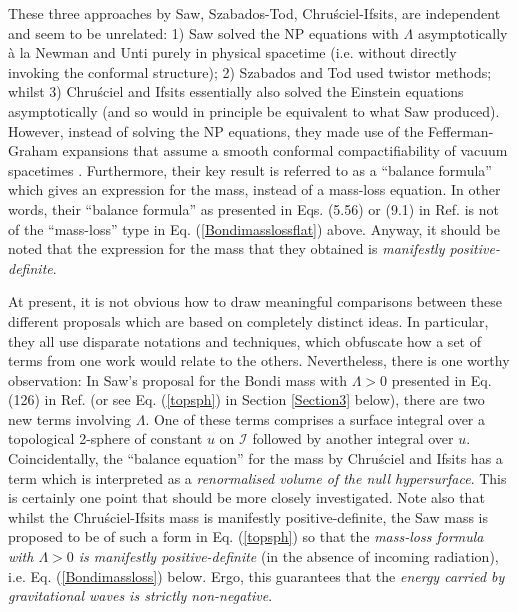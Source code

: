 \documentclass[aps,pre,preprint,superscriptaddress,showpacs,showkeys]{revtex4-1}
\begin{document}
These three approaches by Saw, Szabados-Tod, Chru\'{s}ciel-Ifsits, are independent and seem to be unrelated: 1) Saw solved the NP equations with $\Lambda$ asymptotically \`{a} la Newman and Unti purely in physical spacetime (i.e. without directly invoking the conformal structure); 2) Szabados and Tod used twistor methods; whilst 3) Chru\'{s}ciel and Ifsits essentially also solved the Einstein equations asymptotically (and so would in principle be equivalent to what Saw produced). However, instead of solving the NP equations, they made use of the Fefferman-Graham expansions that assume a smooth conformal compactifiability of vacuum spacetimes \cite{FG1,FG2}. Furthermore, their key result is referred to as a ``balance formula'' which gives an expression for the mass, instead of a mass-loss equation. In other words, their ``balance formula'' as presented in Eqs. (5.56) or (9.1) in Ref. \cite{Chrusciel} is not of the ``mass-loss'' type in Eq. (\ref{Bondimasslossflat}) above. Anyway, it should be noted that the expression for the mass that they obtained is \emph{manifestly positive-definite}.

At present, it is not obvious how to draw meaningful comparisons between these different proposals which are based on completely distinct ideas. In particular, they all use disparate notations and techniques, which obfuscate how a set of terms from one work would relate to the others. Nevertheless, there is one worthy observation: In Saw's proposal for the Bondi mass with $\Lambda>0$ presented in Eq. (126) in Ref. \cite{Vee2016} (or see Eq. (\ref{topsph}) in Section \ref{Section3} below), there are two new terms involving $\Lambda$. One of these terms comprises a surface integral over a topological 2-sphere of constant $u$ on $\mathcal{I}$ followed by another integral over $u$. Coincidentally, the ``balance equation'' for the mass by Chru\'{s}ciel and Ifsits has a term which is interpreted as a \emph{renormalised volume of the null hypersurface}. This is certainly one point that should be more closely investigated. Note also that whilst the Chru\'{s}ciel-Ifsits mass is manifestly positive-definite, the Saw mass is proposed to be of such a form in Eq. (\ref{topsph}) so that the \emph{mass-loss formula with $\Lambda>0$ is manifestly positive-definite} (in the absence of incoming radiation), i.e. Eq. (\ref{Bondimassloss}) below. Ergo, this guarantees that the \emph{energy carried by gravitational waves is strictly non-negative}.
\end{document}
